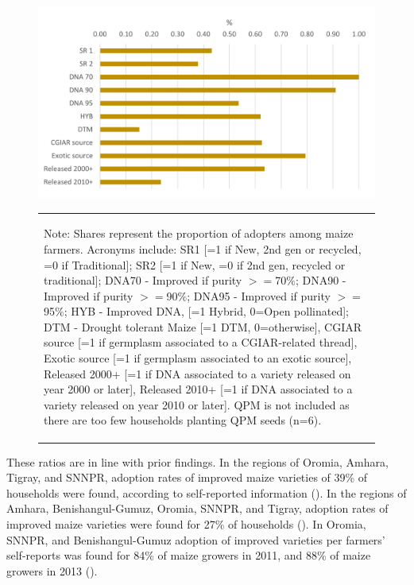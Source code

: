 \documentclass[11pt]{article}
\begin{document}
\begin{figure}[htpb]
    \centering
    \caption{Adoption rates of improved varieties in 2018 (by self-report, purity level, crop type, source and year of release)}\label{fig:adoption_r4}
    \includegraphics[width=.7\textwidth]{results/figures/adoption_r4.png}
    \begin{table}[H]
    \centering
        \begin{tabular}{p{}} 
            \begin{tablenotes}
                  \small
                  \item Note: Shares represent the proportion of adopters among maize farmers. Acronyms include: SR1 [=1 if New, 2nd gen or recycled, =0 if Traditional]; SR2  [=1 if New, =0 if 2nd gen, recycled or traditional]; DNA70 - Improved if purity $>=$70$\%$; DNA90 - Improved if purity $>=$90$\%$; DNA95 - Improved if purity $>=$95$\%$; HYB - Improved DNA, [=1 Hybrid, 0=Open pollinated]; DTM - Drought tolerant Maize [=1 DTM, 0=otherwise], CGIAR source [=1 if germplasm associated to a CGIAR-related thread], Exotic source [=1 if germplasm associated to an exotic source], Released 2000+ [=1 if DNA associated to a variety released on year 2000 or later], Released 2010+ [=1 if DNA associated to a variety released on year 2010 or later]. QPM is not included as there are too few households planting QPM seeds (n=6).
            \end{tablenotes}
        \end{tabular}
    \end{table}   
\end{figure}

These ratios are in line with prior findings. In the regions of Oromia, Amhara, Tigray, and SNNPR, adoption rates of improved maize varieties of 39\% of households were found, according to self-reported information (\cite{Zeng15}). In the regions of Amhara, Benishangul-Gumuz, Oromia, SNNPR, and Tigray, adoption rates of improved maize varieties were found for 27\% of households (\cite{Jaleta2018-oj}). In Oromia, SNNPR, and Benishangul-Gumuz adoption of improved varieties per farmers’ self-reports was found for 84\% of maize growers in 2011, and 88\% of maize growers in 2013 (\cite{Yirga17}).
\end{document}
